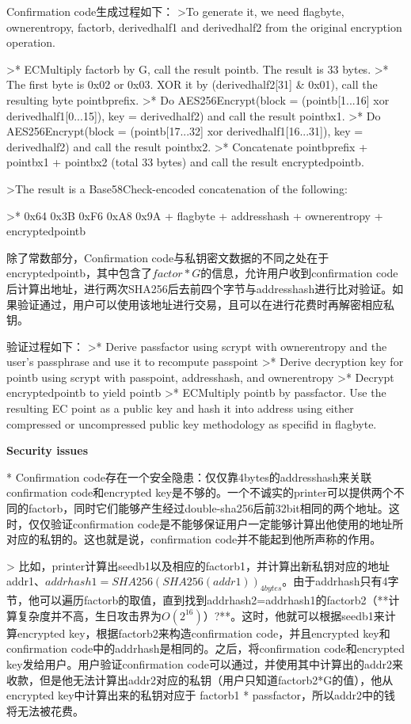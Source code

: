 Confirmation code生成过程如下：
>To generate it, we need flagbyte, ownerentropy, factorb, derivedhalf1 and derivedhalf2 from the original encryption operation.

>* ECMultiply factorb by G, call the result pointb. The result is 33 bytes.
>* The first byte is 0x02 or 0x03. XOR it by (derivedhalf2[31] \& 0x01), call the resulting byte pointbprefix.
>* Do AES256Encrypt(block = (pointb[1...16] xor derivedhalf1[0...15]), key = derivedhalf2) and call the result pointbx1.
>* Do AES256Encrypt(block = (pointb[17...32] xor derivedhalf1[16...31]), key = derivedhalf2) and call the result pointbx2.
>* Concatenate pointbprefix + pointbx1 + pointbx2 (total 33 bytes) and call the result encryptedpointb.  

>The result is a Base58Check-encoded concatenation of the following:  

>* 0x64 0x3B 0xF6 0xA8 0x9A + flagbyte + addresshash + ownerentropy + encryptedpointb

除了常数部分，Confirmation code与私钥密文数据的不同之处在于encryptedpointb，其中包含了$factor*G$的信息，允许用户收到confirmation code后计算出地址，进行两次SHA256后去前四个字节与addresshash进行比对验证。如果验证通过，用户可以使用该地址进行交易，且可以在进行花费时再解密相应私钥。

验证过程如下：
>* Derive passfactor using scrypt with ownerentropy and the user's passphrase and use it to recompute passpoint
>* Derive decryption key for pointb using scrypt with passpoint, addresshash, and ownerentropy
>* Decrypt encryptedpointb to yield pointb
>* ECMultiply pointb by passfactor. Use the resulting EC point as a public key and hash it into address using either compressed or 
uncompressed public key methodology as specifid in flagbyte.

\textbf{ Security issues}

* Confirmation code存在一个安全隐患：仅仅靠4bytes的addresshash来关联confirmation code和encrypted key是不够的。一个不诚实的printer可以提供两个不同的factorb，同时它们能够产生经过double-sha256后前32bit相同的两个地址。这时，仅仅验证confirmation code是不能够保证用户一定能够计算出他使用的地址所对应的私钥的。这也就是说，confirmation code并不能起到他所声称的作用。

> 比如，printer计算出seedb1以及相应的factorb1，并计算出新私钥对应的地址addr1、$addrhash1=SHA256(SHA256(addr1))_{4bytes}$。由于addrhash只有4字节，他可以遍历factorb的取值，直到找到addrhash2=addrhash1的factorb2（**计算复杂度并不高，生日攻击界为$O(2^{16})$）?**。这时，他就可以根据seedb1来计算encrypted key，根据factorb2来构造confirmation code，并且encrypted key和confirmation code中的addrhash是相同的。之后，将confirmation code和encrypted key发给用户。用户验证confirmation code可以通过，并使用其中计算出的addr2来收款，但是他无法计算出addr2对应的私钥（用户只知道factorb2*G的值），他从encrypted key中计算出来的私钥对应于 factorb1 * passfactor，所以addr2中的钱将无法被花费。

